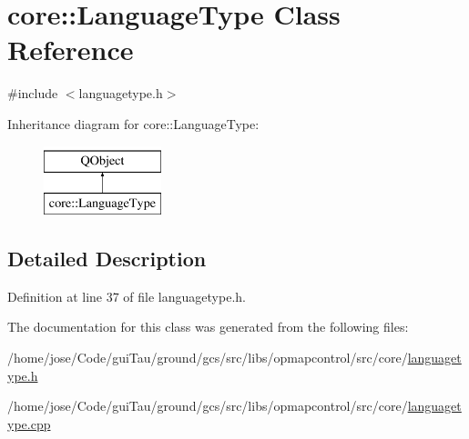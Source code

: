 \hypertarget{classcore_1_1_language_type}{\section{core\-:\-:Language\-Type Class Reference}
\label{classcore_1_1_language_type}
}


{\ttfamily \#include $<$languagetype.\-h$>$}

Inheritance diagram for core\-:\-:Language\-Type\-:\begin{figure}[H]
\begin{center}
\leavevmode
\includegraphics[height=2.000000cm]{classcore_1_1_language_type}
\end{center}
\end{figure}


\subsection{Detailed Description}


Definition at line 37 of file languagetype.\-h.



The documentation for this class was generated from the following files\-:\begin{DoxyCompactItemize}
\item 
/home/jose/\-Code/gui\-Tau/ground/gcs/src/libs/opmapcontrol/src/core/\hyperlink{languagetype_8h}{languagetype.\-h}\item 
/home/jose/\-Code/gui\-Tau/ground/gcs/src/libs/opmapcontrol/src/core/\hyperlink{languagetype_8cpp}{languagetype.\-cpp}\end{DoxyCompactItemize}
